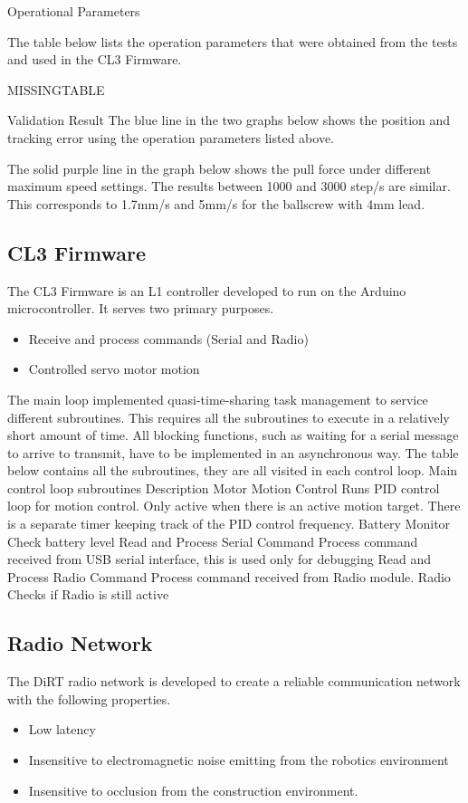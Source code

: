 Operational Parameters

The table below lists the operation parameters that were obtained from the tests and used in the CL3 Firmware.

MISSINGTABLE

Validation Result
The blue line in the two graphs below shows the position and tracking error using the operation parameters listed above.

The solid purple line in the graph below shows the pull force under different maximum speed settings. The results between 1000 and 3000 step/s are similar. This corresponds to 1.7mm/s and 5mm/s for the ballscrew with 4mm lead.

\subsection{CL3 Firmware}
The CL3 Firmware is an L1 controller developed to run on the Arduino microcontroller. It serves two primary purposes.

\begin{itemize}
    \item Receive and process commands (Serial and Radio)
    \item Controlled servo motor motion
\end{itemize}

The main loop implemented quasi-time-sharing task management to service different subroutines. This requires all the subroutines to execute in a relatively short amount of time. All blocking functions, such as waiting for a serial message to arrive to transmit, have to be implemented in an asynchronous way. The table below contains all the subroutines, they are all visited in each control loop.
Main control loop subroutines
Description
Motor Motion Control
Runs PID control loop for motion control. Only active when there is an active motion target. There is a separate timer keeping track of the PID control frequency.
Battery Monitor
Check battery level
Read and Process Serial Command 
Process command received from USB serial interface, this is used only for debugging
Read and Process Radio Command 
Process command received from Radio module. 
Radio
Checks if Radio is still active


\subsection{Radio Network}
The DiRT radio network is developed to create a reliable communication network with the following properties.
\begin{itemize}
    \item Low latency
    \item Insensitive to electromagnetic noise emitting from the robotics environment
    \item Insensitive to occlusion from the construction environment. 
\end{itemize}

